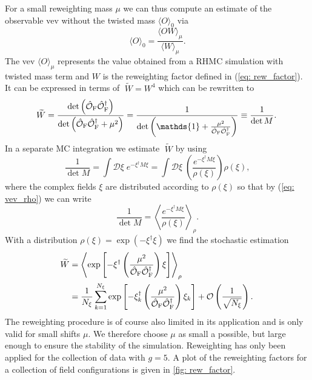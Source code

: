 %
%
For a small reweighting mass $\mu$ we can thus compute an estimate of the observable vev without the twisted mass $\langle O \rangle_{0}$ via
%
%
\begin{equation}
\langle O \rangle_{0} = \frac{\langle O W \rangle_{\mu}}{\langle W \rangle_{\mu}} .
\end{equation}
%
%
The vev $\langle O \rangle_{\mu}$ represents the value obtained from a RHMC simulation with twisted mass term and $W$ is the reweighting factor defined in (\ref{eq: rew_factor}). It can be expressed in terms of $\;\widetilde{\!W}=W^{4}$ which can be rewritten to
%
%
\begin{equation}
\widetilde{\!W} = \frac{\det \left(\hat{\mathcal{O}}_{\rm F}\hat{\mathcal{O}}_{\rm F}^{\dagger}\right)}{\det\left(\hat{\mathcal{O}}_{\rm F}\hat{\mathcal{O}}_{\rm F}^{\dagger}+ \mu^{2}\right)} = \frac{1}{\det\left( \mathds{1}+\frac{\mu^{2}}{\hat{\mathcal{O}}_{\rm F}\hat{\mathcal{O}}_{\rm F}^{\dagger}}\right)} \equiv \frac{1}{\det M}.
\end{equation}
%
%
In a separate MC integration we estimate $\;\widetilde{\!W}$ by using
%
%
\begin{equation}
\frac{1}{\det M} = \int \mathcal{D}\xi \; e^{-\xi^{\dagger}M\xi} = \int \mathcal{D}\xi\; \left(\frac{e^{-\xi^{\dagger}M\xi}}{\rho(\xi)}\right) \rho(\xi),
\end{equation}
%
%
where the complex fields $\xi$ are distributed according to $\rho(\xi)$ so that by (\ref{eq: vev_rho}) we can write
%
%
\begin{equation}
\frac{1}{\det M} = \left\langle \frac{e^{-\xi^{\dagger}M\xi}}{\rho(\xi)}\right\rangle_{\rho}.
\end{equation}
%
%
With a  distribution $\rho(\xi)=\exp(-\xi^{\dagger}\xi)$ we find the stochastic estimation
%
%
\begin{equation}
\begin{alignedat}{2}
\widetilde{\!W} &= \left\langle \exp \left[ -\xi^{\dagger}\left(\frac{\mu^{2}}{\hat{\mathcal{O}}_{\rm F}\hat{\mathcal{O}}_{\rm F}^{\dagger}}\right)\xi\right]\right\rangle_{\rho} \\
&= \frac{1}{N_{\xi}} \sum\limits_{k=1}^{N_{\xi}} \exp \left[ -\xi_{k}^{\dagger}\left(\frac{\mu^{2}}{\hat{\mathcal{O}}_{\rm F}\hat{\mathcal{O}}_{\rm F}^{\dagger}}\right)\xi_{k}\right] + \mathcal{O}\left(\frac{1}{\sqrt{N_{\xi}}}\right). 
\end{alignedat}
\end{equation}
%
%
The reweighting procedure is of course also limited in its application and is only valid for small shifts $\mu$. We therefore choose $\mu$ as small a possible, but large enough to ensure the stability of the simulation. Reweighting has only been applied for the collection of data with $g=5$. A plot of the reweighting factors for a collection of field configurations is given in \autoref{fig: rew_factor}.
